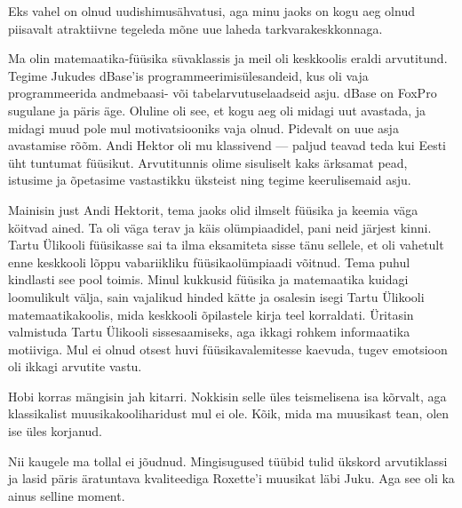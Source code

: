 
Eks vahel on olnud uudishimusähvatusi, aga minu jaoks on kogu aeg 
olnud piisavalt atraktiivne tegeleda mõne uue laheda 
tarkvarakeskkonnaga. 

Ma olin matemaatika-füüsika
süvaklassis ja meil oli keskkoolis eraldi arvutitund. Tegime Jukudes
dBase'is programmeerimisülesandeid, kus oli vaja programmeerida
andmebaasi- või tabelarvutuselaadseid asju. dBase on FoxPro 
sugulane ja päris äge. Oluline oli see, et 
kogu aeg oli midagi uut avastada, ja midagi muud pole mul motivatsiooniks vaja olnud. Pidevalt on uue 
asja avastamise rõõm. Andi Hektor oli mu 
klassivend --- paljud teavad teda kui Eesti üht tuntumat füüsikut. 
Arvutitunnis olime sisuliselt kaks ärksamat pead, istusime ja 
õpetasime vastastikku üksteist ning tegime keerulisemaid asju. 


Mainisin just Andi Hektorit, tema 
jaoks olid ilmselt füüsika ja keemia väga köitvad ained. Ta oli 
väga terav ja käis olümpiaadidel, pani neid järjest kinni. Tartu Ülikooli 
füüsikasse sai ta ilma eksamiteta sisse tänu sellele, et oli vahetult enne 
keskkooli lõppu vabariikliku füüsikaolümpiaadi võitnud. Tema puhul 
kindlasti see pool toimis. Minul kukkusid füüsika ja matemaatika kuidagi
loomulikult välja, sain vajalikud hinded kätte ja osalesin isegi 
Tartu Ülikooli matemaatikakoolis, mida keskkooli õpilastele 
kirja teel korraldati. Üritasin valmistuda Tartu 
Ülikooli sissesaamiseks, aga ikkagi rohkem informaatika motiiviga. Mul ei olnud
otsest huvi füüsikavalemitesse kaevuda, tugev emotsioon oli ikkagi 
arvutite vastu. 


Hobi korras mängisin jah kitarri. Nokkisin selle üles 
teismelisena isa kõrvalt, aga klassikalist muusikakooliharidust mul ei 
ole. Kõik, mida ma muusikast tean, olen ise üles korjanud. 


Nii kaugele ma tollal ei jõudnud. Mingisugused tüübid tulid ükskord 
arvutiklassi ja lasid päris äratuntava 
kvaliteediga Roxette'i muusikat läbi Juku. Aga see oli ka ainus selline 
moment. 

